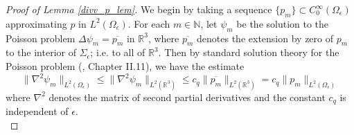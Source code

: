 \documentclass[11pt]{article}
\numberwithin{equation}{section}
\newcommand{\R}{\mathbb{R}}
\newcommand{\N}{\mathbb{N}}
\theoremstyle{definition}
\begin{document}
\begin{proof}[Proof of Lemma \ref{divv_p_lem}]
We begin by taking a sequence $\{p_m\}\subset C_0^{\infty}(\Omega_{\epsilon})$ approximating $p$ in $L^2(\Omega_{\epsilon})$. For each $m\in \N$, let $\psi_m$ be the solution to the Poisson problem $\Delta\psi_m = \overline{p_m}$ in $\R^3$, where $\overline{p_m}$ denotes the extension by zero of $p_m$ to the interior of $\Sigma_{\epsilon}$; i.e. to all of $\R^3$. Then by standard solution theory for the Poisson problem (\cite{galdi2011introduction}, Chapter II.11), we have the estimate
\begin{equation}\label{poisson_est}
 \|\nabla^2\psi_m\|_{L^2(\Omega_{\epsilon})} \le \|\nabla^2\psi_m\|_{L^2(\R^3)} \le c_q\|\overline{p_m}\|_{L^2(\R^3)} = c_q\|p_m\|_{L^2(\Omega_{\epsilon})} 
\end{equation}
where $\nabla^2$ denotes the matrix of second partial derivatives and the constant $c_q$ is independent of $\epsilon$. \\


\end{proof}
\end{document}
